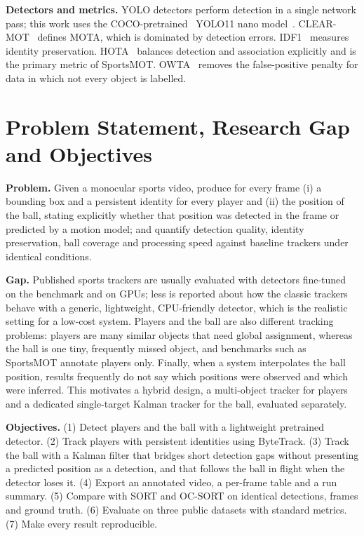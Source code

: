 \documentclass[conference]{IEEEtran}
\begin{document}
\textbf{Detectors and metrics.} YOLO detectors perform detection in a single
network pass; this work uses the COCO-pretrained~\cite{coco} YOLO11 nano
model~\cite{yolo11}. CLEAR-MOT~\cite{clear} defines MOTA, which is dominated by
detection errors. IDF1~\cite{idf1} measures identity preservation.
HOTA~\cite{hota} balances detection and association explicitly and is the primary
metric of SportsMOT. OWTA~\cite{owta} removes the false-positive penalty for
data in which not every object is labelled.

\section{Problem Statement, Research Gap and Objectives}
\textbf{Problem.} Given a monocular sports video, produce for every frame (i) a
bounding box and a persistent identity for every player and (ii) the position of
the ball, stating explicitly whether that position was detected in the frame or
predicted by a motion model; and quantify detection quality, identity
preservation, ball coverage and processing speed against baseline trackers under
identical conditions.

\textbf{Gap.} Published sports trackers are usually evaluated with detectors
fine-tuned on the benchmark and on GPUs; less is reported about how the classic
trackers behave with a generic, lightweight, CPU-friendly detector, which is the
realistic setting for a low-cost system. Players and the ball are also different
tracking problems: players are many similar objects that need global assignment,
whereas the ball is one tiny, frequently missed object, and benchmarks such as
SportsMOT annotate players only. Finally, when a system interpolates the ball
position, results frequently do not say which positions were observed and which
were inferred. This motivates a hybrid design, a multi-object tracker for players
and a dedicated single-target Kalman tracker for the ball, evaluated separately.

\textbf{Objectives.} (1) Detect players and the ball with a lightweight
pretrained detector. (2) Track players with persistent identities using
ByteTrack. (3) Track the ball with a Kalman filter that bridges short detection
gaps without presenting a predicted position as a detection, and that follows the
ball in flight when the detector loses it. (4) Export an
annotated video, a per-frame table and a run summary. (5) Compare with SORT and
OC-SORT on identical detections, frames and ground truth. (6) Evaluate on three
public datasets with standard metrics. (7) Make every result reproducible.
\end{document}
